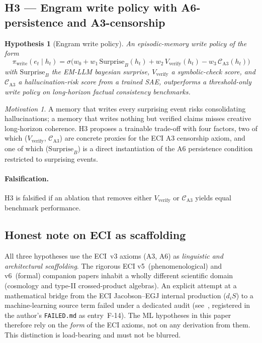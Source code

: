 \documentclass[10pt,a4paper]{article}
\newtheorem{hypothesis}{Hypothesis}
\theoremstyle{remark}
\newtheorem{motivation}{Motivation}
\begin{document}
\subsection{H3 --- Engram write policy with A6-persistence and
A3-censorship}

\begin{hypothesis}[Engram write policy]
\label{hyp:engram}
An episodic-memory write policy of the form
\begin{equation}
 \pi_{\mathrm{write}}(e_t \mid h_t) = \sigma\!\big(
 w_0 + w_1\, \mathrm{Surprise}_B(h_t) + w_2\, V_{\mathrm{verify}}(h_t)
 - w_3\, \mathcal{C}_{\mathrm{A3}}(h_t) \big)
 \label{eq:engram}
\end{equation}
with $\mathrm{Surprise}_B$ the EM-LLM bayesian surprise,
$V_{\mathrm{verify}}$ a symbolic-check score, and
$\mathcal{C}_{\mathrm{A3}}$ a hallucination-risk score from a trained
SAE, outperforms a threshold-only write policy on long-horizon
factual consistency benchmarks.
\end{hypothesis}

\begin{motivation}
A memory that writes every surprising event risks consolidating
hallucinations; a memory that writes nothing but verified claims
misses creative long-horizon coherence. H3 proposes a trainable
trade-off with four factors, two of which
($V_{\mathrm{verify}}$, $\mathcal{C}_{\mathrm{A3}}$) are concrete
proxies for the ECI A3 censorship axiom, and one of which
($\mathrm{Surprise}_B$) is a direct instantiation of the A6
persistence condition restricted to surprising events.
\end{motivation}

\paragraph{Falsification.}
H3 is falsified if an ablation that removes either
$V_{\mathrm{verify}}$ or $\mathcal{C}_{\mathrm{A3}}$ yields equal
benchmark performance.

\subsection{Honest note on ECI as scaffolding}

All three hypotheses use the ECI~v3 axioms (A3, A6) as
\emph{linguistic and architectural scaffolding}. The rigorous ECI
v5~(phenomenological) and v6~(formal) companion papers
inhabit a wholly different scientific domain (cosmology and type-II
crossed-product algebras). An explicit attempt at a mathematical
bridge from the ECI Jacobson--EGJ internal production
($d_i S$) to a machine-learning source term failed under a
dedicated audit (see~\cite{ECIv6Audit}, registered in the
author's \texttt{FAILED.md} as entry~F-14). The ML hypotheses in
this paper therefore rely on the \emph{form} of the ECI axioms,
not on any derivation from them. This distinction is load-bearing
and must not be blurred.
\end{document}
